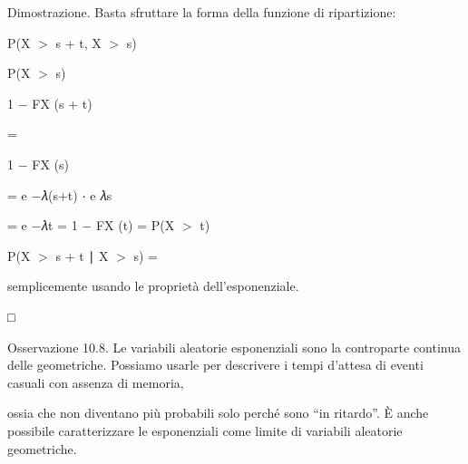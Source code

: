 \documentclass[a4paper,portrait,12pt]{article}
\begin{document}
\begin{flushleft}
Dimostrazione. Basta sfruttare la forma della funzione di ripartizione:
\end{flushleft}


\begin{flushleft}
P(X $>$ s + t, X $>$ s)
\end{flushleft}


\begin{flushleft}
P(X $>$ s)
\end{flushleft}


\begin{flushleft}
1 $-$ FX (s + t)
\end{flushleft}


=


\begin{flushleft}
1 $-$ FX (s)
\end{flushleft}


\begin{flushleft}
= e $-$𝜆(s+t) ⋅ e 𝜆s
\end{flushleft}


\begin{flushleft}
= e $-$𝜆t = 1 $-$ FX (t) = P(X $>$ t)
\end{flushleft}





\begin{flushleft}
P(X $>$ s + t ∣ X $>$ s) =
\end{flushleft}





\begin{flushleft}
semplicemente usando le propriet\`{a} dell'esponenziale.
\end{flushleft}





□





\begin{flushleft}
Osservazione 10.8. Le variabili aleatorie esponenziali sono la controparte continua delle geometriche. Possiamo usarle per descrivere i tempi d'attesa di eventi casuali con assenza di memoria,
\end{flushleft}


\begin{flushleft}
ossia che non diventano più probabili solo perch\'{e} sono {``}in ritardo''. \`{E} anche possibile caratterizzare le esponenziali come limite di variabili aleatorie geometriche.
\end{flushleft}
\end{document}
